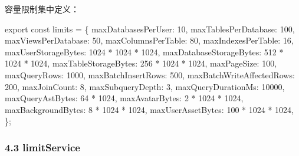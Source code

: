 \documentclass[
  a4paper,
  UTF8]{ctexart}
\newenvironment{Shaded}{}{}
\newcommand{\DecValTok}[1]{\textcolor[rgb]{0.25,0.63,0.44}{#1}}
\newcommand{\NormalTok}[1]{#1}
\newcommand{\OperatorTok}[1]{\textcolor[rgb]{0.40,0.40,0.40}{#1}}
\begin{document}
容量限制集中定义：

\begin{Shaded}
\begin{Highlighting}[]
\NormalTok{export const limits }\OperatorTok{=}\NormalTok{ \{}
\NormalTok{  maxDatabasesPerUser}\OperatorTok{:} \DecValTok{10}\OperatorTok{,}
\NormalTok{  maxTablesPerDatabase}\OperatorTok{:} \DecValTok{100}\OperatorTok{,}
\NormalTok{  maxViewsPerDatabase}\OperatorTok{:} \DecValTok{50}\OperatorTok{,}
\NormalTok{  maxColumnsPerTable}\OperatorTok{:} \DecValTok{80}\OperatorTok{,}
\NormalTok{  maxIndexesPerTable}\OperatorTok{:} \DecValTok{16}\OperatorTok{,}
\NormalTok{  maxUserStorageBytes}\OperatorTok{:} \DecValTok{1024} \OperatorTok{*} \DecValTok{1024} \OperatorTok{*} \DecValTok{1024}\OperatorTok{,}
\NormalTok{  maxDatabaseStorageBytes}\OperatorTok{:} \DecValTok{512} \OperatorTok{*} \DecValTok{1024} \OperatorTok{*} \DecValTok{1024}\OperatorTok{,}
\NormalTok{  maxTableStorageBytes}\OperatorTok{:} \DecValTok{256} \OperatorTok{*} \DecValTok{1024} \OperatorTok{*} \DecValTok{1024}\OperatorTok{,}
\NormalTok{  maxPageSize}\OperatorTok{:} \DecValTok{100}\OperatorTok{,}
\NormalTok{  maxQueryRows}\OperatorTok{:} \DecValTok{1000}\OperatorTok{,}
\NormalTok{  maxBatchInsertRows}\OperatorTok{:} \DecValTok{500}\OperatorTok{,}
\NormalTok{  maxBatchWriteAffectedRows}\OperatorTok{:} \DecValTok{200}\OperatorTok{,}
\NormalTok{  maxJoinCount}\OperatorTok{:} \DecValTok{8}\OperatorTok{,}
\NormalTok{  maxSubqueryDepth}\OperatorTok{:} \DecValTok{3}\OperatorTok{,}
\NormalTok{  maxQueryDurationMs}\OperatorTok{:} \DecValTok{10000}\OperatorTok{,}
\NormalTok{  maxQueryAstBytes}\OperatorTok{:} \DecValTok{64} \OperatorTok{*} \DecValTok{1024}\OperatorTok{,}
\NormalTok{  maxAvatarBytes}\OperatorTok{:} \DecValTok{2} \OperatorTok{*} \DecValTok{1024} \OperatorTok{*} \DecValTok{1024}\OperatorTok{,}
\NormalTok{  maxBackgroundBytes}\OperatorTok{:} \DecValTok{8} \OperatorTok{*} \DecValTok{1024} \OperatorTok{*} \DecValTok{1024}\OperatorTok{,}
\NormalTok{  maxUserAssetBytes}\OperatorTok{:} \DecValTok{100} \OperatorTok{*} \DecValTok{1024} \OperatorTok{*} \DecValTok{1024}\OperatorTok{,}
\NormalTok{\}}\OperatorTok{;}
\end{Highlighting}
\end{Shaded}

\hypertarget{limitservice}{%
\subsubsection{4.3 limitService}\label{limitservice}}
\end{document}
